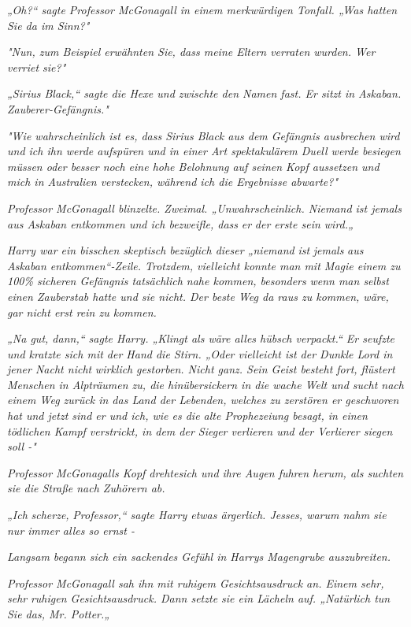 {\emph{„Oh?“ sagte Professor McGonagall in einem merkwürdigen Tonfall. „Was hatten Sie da im Sinn?"}

\emph{"Nun, zum Beispiel erwähnten Sie, dass meine Eltern verraten wurden. Wer verriet sie?"}

\emph{„Sirius Black,“ sagte die Hexe und zwischte den Namen fast. Er sitzt in Askaban. Zauberer-Gefängnis."}

\emph{"Wie wahrscheinlich ist es, dass Sirius Black aus dem Gefängnis ausbrechen wird und ich ihn werde aufspüren und in einer Art spektakulärem Duell werde besiegen müssen oder besser noch eine hohe Belohnung auf seinen Kopf aussetzen und mich in Australien verstecken, während ich die Ergebnisse abwarte?"}

\emph{Professor McGonagall blinzelte. Zweimal. „Unwahrscheinlich. Niemand ist jemals aus Askaban entkommen und ich bezweifle, dass} \emph{\emph{er}} \emph{der erste sein wird.„}

\emph{Harry war ein bisschen skeptisch bezüglich dieser „\emph{niemand}} \emph{ist} \emph{\emph{jemals}} \emph{aus Askaban entkommen“-Zeile. Trotzdem, vielleicht konnte man mit Magie einem zu 100\% sicheren Gefängnis tatsächlich nahe kommen, besonders} \emph{wenn man selbst einen Zauberstab hatte und sie nicht. Der beste Weg da raus zu kommen, wäre, gar nicht erst rein zu kommen.}

\emph{„Na gut, dann,“ sagte Harry. „Klingt als wäre alles hübsch verpackt.“ Er seufzte und kratzte sich mit der Hand die Stirn. „Oder vielleicht ist der Dunkle Lord in jener Nacht nicht} \emph{\emph{wirklich}} \emph{gestorben. Nicht ganz. Sein Geist besteht fort, flüstert Menschen in Alpträumen zu, die hinübersickern in die wache Welt und sucht nach einem Weg zurück in das Land der Lebenden, welches zu zerstören er geschworen hat und jetzt sind er und ich, wie es die alte Prophezeiung besagt, in einen tödlichen Kampf verstrickt, in dem der Sieger verlieren und der Verlierer siegen soll -"}

\emph{Professor McGonagalls Kopf drehtesich und ihre Augen fuhren herum, als suchten sie die Straße nach Zuhörern ab.}

\emph{„Ich} \emph{\emph{scherze,}} \emph{Professor,“ sagte Harry etwas ärgerlich. Jesses, warum nahm sie nur immer alles so ernst -}

\emph{Langsam begann sich ein sackendes Gefühl in Harrys Magengrube auszubreiten.}

\emph{Professor McGonagall sah ihn mit ruhigem Gesichtsausdruck an. Einem sehr,} \emph{\emph{sehr}} \emph{ruhigen Gesichtsausdruck. Dann setzte sie ein Lächeln auf. „Natürlich tun Sie das, Mr. Potter.„}

}
